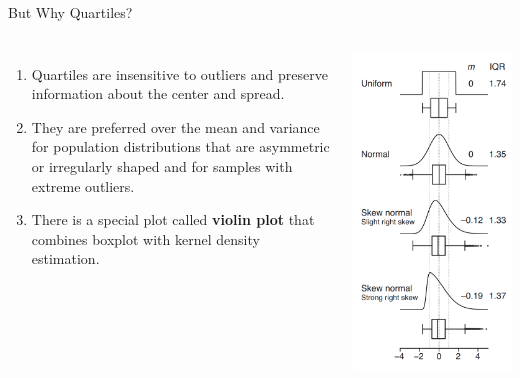 \documentclass[aspectratio=169,xcolor=dvipsnames,svgnames,x11names,fleqn]{beamer}
\begin{document}
\begin{frame}{But Why Quartiles?}
\begin{columns}[c]
\begin{enumerate}
    \item Quartiles are
insensitive to outliers and preserve information about the center and
spread. 
\item  They are preferred over the mean and variance for
population distributions that are asymmetric or irregularly shaped
and for samples with extreme outliers.
\item There is a special plot called \textbf{violin plot} that combines boxplot with kernel density estimation.
\end{enumerate}
 \includegraphics[height=0.79\paperheight]{figures/boxplot_distributions.png}
\end{columns}


\end{frame}
\end{document}
